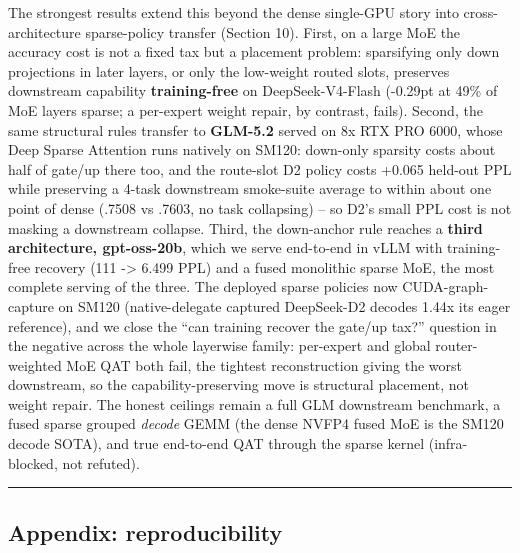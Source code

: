 \documentclass[
]{article}
\begin{document}
The strongest results extend this beyond the dense single-GPU story into
cross-architecture sparse-policy transfer (Section 10). First, on a
large MoE the accuracy cost is not a fixed tax but a placement problem:
sparsifying only down projections in later layers, or only the
low-weight routed slots, preserves downstream capability
\textbf{training-free} on DeepSeek-V4-Flash (-0.29pt at 49\% of MoE
layers sparse; a per-expert weight repair, by contrast, fails). Second,
the same structural rules transfer to \textbf{GLM-5.2} served on 8x RTX
PRO 6000, whose Deep Sparse Attention runs natively on SM120: down-only
sparsity costs about half of gate/up there too, and the route-slot D2
policy costs +0.065 held-out PPL while preserving a 4-task downstream
smoke-suite average to within about one point of dense (.7508 vs .7603,
no task collapsing) -- so D2's small PPL cost is not masking a
downstream collapse. Third, the down-anchor rule reaches a \textbf{third
architecture, gpt-oss-20b}, which we serve end-to-end in vLLM with
training-free recovery (111 -\textgreater{} 6.499 PPL) and a fused
monolithic sparse MoE, the most complete serving of the three. The
deployed sparse policies now CUDA-graph-capture on SM120
(native-delegate captured DeepSeek-D2 decodes 1.44x its eager
reference), and we close the ``can training recover the gate/up tax?''
question in the negative across the whole layerwise family: per-expert
and global router-weighted MoE QAT both fail, the tightest
reconstruction giving the worst downstream, so the capability-preserving
move is structural placement, not weight repair. The honest ceilings
remain a full GLM downstream benchmark, a fused sparse grouped
\emph{decode} GEMM (the dense NVFP4 fused MoE is the SM120 decode SOTA),
and true end-to-end QAT through the sparse kernel (infra-blocked, not
refuted).

\begin{center}\rule{0.5\linewidth}{0.5pt}\end{center}

\subsection{Appendix: reproducibility}\label{appendix-reproducibility}
\end{document}

